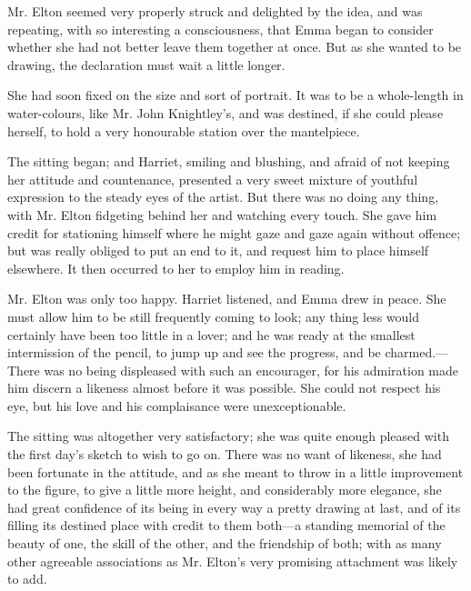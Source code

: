 Mr. Elton seemed very properly struck and delighted by the idea, and was repeating,  with so interesting a consciousness, that Emma began to consider whether she had not better leave them together at once. But as she wanted to be drawing, the declaration must wait a little longer.

She had soon fixed on the size and sort of portrait. It was to be a whole-length in water-colours, like Mr. John Knightley's, and was destined, if she could please herself, to hold a very honourable station over the mantelpiece.

The sitting began; and Harriet, smiling and blushing, and afraid of not keeping her attitude and countenance, presented a very sweet mixture of youthful expression to the steady eyes of the artist. But there was no doing any thing, with Mr. Elton fidgeting behind her and watching every touch. She gave him credit for stationing himself where he might gaze and gaze again without offence; but was really obliged to put an end to it, and request him to place himself elsewhere. It then occurred to her to employ him in reading.


Mr. Elton was only too happy. Harriet listened, and Emma drew in peace. She must allow him to be still frequently coming to look; any thing less would certainly have been too little in a lover; and he was ready at the smallest intermission of the pencil, to jump up and see the progress, and be charmed.---There was no being displeased with such an encourager, for his admiration made him discern a likeness almost before it was possible. She could not respect his eye, but his love and his complaisance were unexceptionable.

The sitting was altogether very satisfactory; she was quite enough pleased with the first day's sketch to wish to go on. There was no want of likeness, she had been fortunate in the attitude, and as she meant to throw in a little improvement to the figure, to give a little more height, and considerably more elegance, she had great confidence of its being in every way a pretty drawing at last, and of its filling its destined place with credit to them both---a standing memorial of the beauty of one, the skill of the other, and the friendship of both; with as many other agreeable associations as Mr. Elton's very promising attachment was likely to add.


